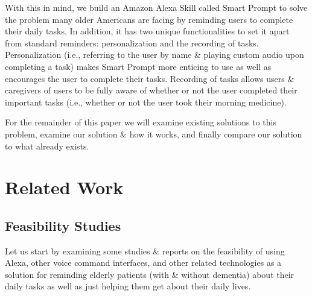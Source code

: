 \documentclass[11pt, oneside]{article}
\begin{document}
With this in mind, we build an Amazon Alexa Skill called Smart Prompt to solve the problem many older Americans are facing by reminding users to complete their daily tasks. 
In addition, it has two unique functionalities to set it apart from standard reminders: personalization and the recording of tasks. 
Personalization (i.e., referring to the user by name \& playing custom audio upon completing a task) makes Smart Prompt more enticing to use as well as encourages the user to complete their tasks. 
Recording of tasks allows users \& caregivers of users to be fully aware of whether or not the user completed their important tasks (i.e., whether or not the user took their morning medicine). 

For the remainder of this paper we will examine existing solutions to this problem, examine our solution \& how it works, and finally compare our solution to what already exists. 


\section{Related Work}

\subsection{Feasibility Studies}

Let us start by examining some studies \& reports on the feasibility of using Alexa, other voice command interfaces, and other related technologies as a solution for reminding elderly patients (with \& without dementia) about their daily tasks as well as just helping them get about their daily lives. 
\end{document}

